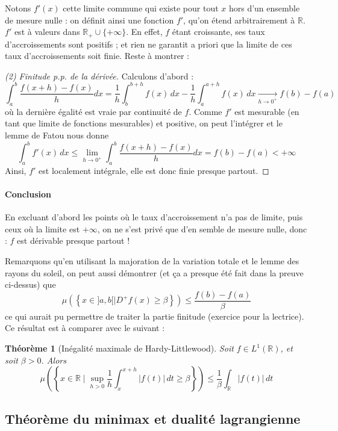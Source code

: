 \documentclass[a4paper, 11pt]{article}
\def\R{\mathbb{R}}
\newtheorem*{theorem}{Théorème}
\begin{document}
Notons $f'(x)$ cette limite commune qui existe pour tout $x$ hors d'un ensemble
de mesure nulle : on définit ainsi une fonction $f'$, qu'on étend arbitrairement
à $\R$. $f'$ est à valeurs dans $\R_+ \cup \{+\infty\}$. En effet, $f$ étant
croissante, ses taux d'accroissements sont positifs ; et rien ne garantit a
priori que la limite de ces taux d'accroissements soit finie. Reste à montrer :

\begin{proof}[(2) Finitude p.p. de la dérivée]
Calculons d'abord :
\[
  \int_a^b \frac{f(x+h) - f(x)}{h}dx =
    \frac{1}{h} \int_b^{b+h} f(x)\,dx - \frac{1}{h} \int_a^{a+h} f(x)\,dx
    \underset{h \to 0^+}{\longrightarrow} f(b) - f(a)
\]
où la dernière égalité est vraie par continuité de $f$. Comme $f'$ est mesurable
(en tant que limite de fonctions mesurables) et positive, on peut l'intégrer et
le lemme de Fatou nous donne
\[ \int_a^b f'(x)\,dx \leq \lim_{h \to 0^+} \int_a^b \frac{f(x+h) - f(x)}{h}dx =
  f(b)- f(a) < +\infty \] 
Ainsi, $f'$ est localement intégrale, elle est donc finie presque partout.
\end{proof}

\paragraph{Conclusion} En excluant d'abord les points où le taux d'accroissement
n'a pas de limite, puis ceux où la limite est $+\infty$, on ne s'est privé que
d'en semble de mesure nulle, donc : $f$ est dérivable presque partout !

Remarquons qu'en utilisant la majoration de la variation totale et le lemme des
rayons du soleil, on peut aussi démontrer (et ça a presque été fait dans la
preuve ci-dessus) que
\[ \mu\left( \left\{ x \in ]a,b[ \mid D^+f(x) \geq \beta \right\} \right)
  \leq \frac{f(b)-f(a)}{\beta} \]
ce qui aurait pu permettre de traiter la partie finitude (exercice pour la
lectrice). Ce résultat est à comparer avec le suivant :
\begin{theorem}[Inégalité maximale de Hardy-Littlewood]
  Soit $f \in L^1(\R)$, et soit $\beta > 0$. Alors
  \[ \mu\left( \left\{ x \in \R \mid \sup_{h > 0} \frac{1}{h} \int_x^{x+h}
        |f(t)|\,dt \geq \beta \right\} \right)
    \leq \frac{1}{\beta} \int_\R |f(t)|\,dt \]
\end{theorem}


\subsection{Théorème du minimax et dualité lagrangienne}
\end{document}
